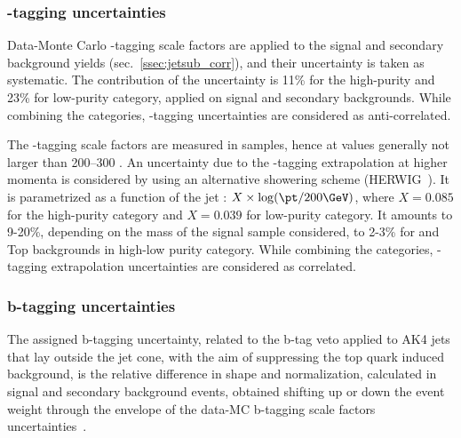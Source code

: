 

\subsubsection{\V-tagging uncertainties}
\label{sec:wtagunc}

Data-Monte Carlo \V-tagging scale factors are applied to the signal and secondary background yields (sec.~\ref{ssec:jetsub_corr}), and their uncertainty is taken as systematic. The contribution of the uncertainty is 11\% for the high-purity and 23\% for low-purity category, applied on signal and secondary backgrounds. While combining the categories, \V-tagging uncertainties are considered as anti-correlated.

\noindent The \V-tagging scale factors are measured in \ttbar samples, hence at \pt values generally not larger than 200--300 \GeV. An uncertainty due to the \V-tagging extrapolation at higher momenta is considered by using an alternative showering scheme (HERWIG~\cite{bib:HERWIG}). It is parametrized as a function of the jet \pt: $X \times \log(\pt/200 \GeV)$, where $X=0.085$ for the high-purity category and $X=0.039$ for low-purity category. It amounts to 9-20\%, depending on the mass of the signal sample considered, to 2-3\% for \VV and Top backgrounds in high-low purity category. While combining the categories, \V-tagging extrapolation uncertainties are considered as correlated.


\subsubsection{b-tagging uncertainties}
\label{sec:btagunc}
The assigned b-tagging uncertainty, related to the b-tag veto applied to AK4 jets that lay outside the \V jet cone, with the aim of suppressing the top quark induced background, is the relative difference in shape and normalization, calculated in signal and secondary background events, obtained shifting up or down the event weight through the envelope of the data-MC b-tagging scale factors uncertainties~\cite{bib:btagsf}.

